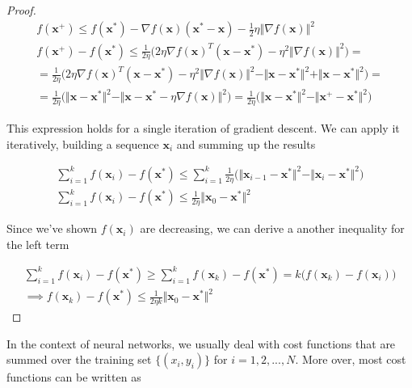 \documentclass{article}
\numberwithin{equation}{subsection}
\begin{document}
\begin{proof}
\begin{gather*}
    f(\textbf{x}^+) \leq f(\textbf{x}^*) - \nabla f(\textbf{x}) (\textbf{x}^*-\textbf{x}) - \frac{1}{2} \eta \Vert \nabla f(\textbf{x}) \Vert^2 \\
    f(\textbf{x}^+) - f(\textbf{x}^*) \leq \frac{1}{2\eta} \Big( 2\eta \nabla f(\textbf{x})^T (\textbf{x}-\textbf{x}^*) - \eta^2 \Vert \nabla f(\textbf{x} ) \Vert^2 \Big) = \\
    = \frac{1}{2\eta} \Big( 2\eta \nabla f(\textbf{x})^T (\textbf{x}-\textbf{x}^*) - \eta^2 \Vert \nabla f(\textbf{x}) \Vert^2 - \Vert \textbf{x} - \textbf{x}^* \Vert^2 + \Vert \textbf{x} - \textbf{x}^* \Vert^2 \Big) = \\
    = \frac{1}{2\eta} \Big( \Vert \textbf{x} - \textbf{x}^* \Vert^2 - \Vert \textbf{x} - \textbf{x}^* - \eta \nabla f(\textbf{x}) \Vert^2  \Big) = \frac{1}{2\eta} \Big( \Vert \textbf{x} - \textbf{x}^* \Vert^2 - \Vert \textbf{x}^+ - \textbf{x}^* \Vert^2  \Big)
\end{gather*}

This expression holds for a single iteration of gradient descent. We can apply it iteratively, building a sequence $\textbf{x}_i$ and summing up the results 

\begin{gather*}
    \sum_{i=1}^k f(\textbf{x}_i) - f(\textbf{x}^*) \leq \sum_{i=1}^k \frac{1}{2\eta} \Big( \Vert \textbf{x}_{i-1} - \textbf{x}^* \Vert^2 - \Vert \textbf{x}_i - \textbf{x}^* \Vert^2 \Big) \\
    \sum_{i=1}^k f(\textbf{x}_i) - f(\textbf{x}^*) \leq \frac{1}{2\eta} \Vert \textbf{x}_0 - \textbf{x}^* \Vert^2
\end{gather*}

Since we've shown $f(\textbf{x}_i)$ are decreasing, we can derive a another inequality for the left term

\begin{gather*}
    \sum_{i=1}^k f(\textbf{x}_i) - f(\textbf{x}^*) \geq \sum_{i=1}^k f(\textbf{x}_k) - f(\textbf{x}^* ) = k \Big( f(\textbf{x}_k) - f(\textbf{x}_i) \Big) \\
    \implies f(\textbf{x}_k) - f(\textbf{x}^*) \leq \frac{1}{2\eta k} \Vert \textbf{x}_0 - \textbf{x}^* \Vert^2
\end{gather*}

\end{proof}


In the context of neural networks, we usually deal with cost functions that are summed over the training set $\{ (x_i,y_i) \}$ for $i = 1,2,...,N$. More over, most cost functions can be written as 
\end{document}
